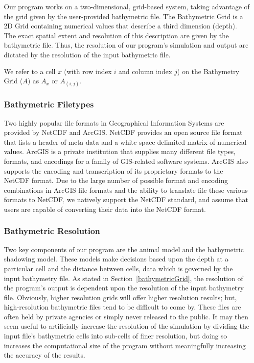 Our program works on a two-dimensional, grid-based system, taking advantage of the grid given by the user-provided bathymetric file.  The Bathymetric Grid is a 2D Grid containing numerical values that describe a third dimension (depth).  The exact spatial extent and resolution of this description are given by the bathymetric file.  Thus, the resolution of our program's simulation and output are dictated by the resolution of the input bathymetric file. 

We refer to a cell $x$ (with row index $i$ and column index $j$) on the Bathymetry Grid ($A$) as $A_x$ or $A_{(i,j)}$.

\subsubsection{Bathymetric Filetypes}
Two highly popular file formats in Geographical Information Systems are provided by NetCDF and ArcGIS.  NetCDF provides an open source file format that lists a header of meta-data and a white-space delimited matrix of numerical values.  ArcGIS is a private institution that supplies many different file types, formats, and encodings for a family of GIS-related software systems.  ArcGIS also supports the encoding and transcription of its proprietary formats to the NetCDF format.  Due to the large number of possible format and encoding combinations in ArcGIS file formats and the ability to translate file these various formats to NetCDF, we natively support the NetCDF standard, and assume that users are capable of converting their data into the NetCDF format.  


\subsubsection{Bathymetric Resolution}
Two key components of our program are the animal model and the bathymetric shadowing model.  These models make decisions based upon the depth at a particular cell and the distance between cells, data which is governed by the input bathymetry file.  As stated in Section~\ref{bathymetricGrid}, the resolution of the program's output is dependent upon the resolution of the input bathymetry file.  Obviously, higher resolution grids will offer higher resolution results; but, high-resolution bathymetric files tend to be difficult to come by.  These files are often held by private agencies or simply never released to the public.  It may then seem useful to artificially increase the resolution of the simulation by dividing the input file's bathymetric cells into sub-cells of finer resolution, but doing so increases the computational size of the program without meaningfully increasing the accuracy of the results.    
 
